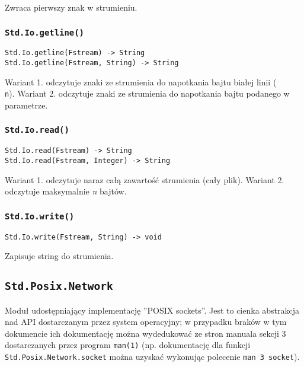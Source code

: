 Zwraca pierwszy znak w strumieniu.

\subsubsection{\texttt{Std.Io.getline()}}

\begin{small}
\begin{lstlisting}
Std.Io.getline(Fstream) -> String
Std.Io.getline(Fstream, String) -> String
\end{lstlisting}
\end{small}

Wariant 1. odczytuje znaki ze strumienia do napotkania bajtu białej linii (\texttt{\\n}).
Wariant 2. odczytuje znaki ze strumienia do napotkania bajtu podanego w parametrze.

\subsubsection{\texttt{Std.Io.read()}}

\begin{small}
\begin{lstlisting}
Std.Io.read(Fstream) -> String
Std.Io.read(Fstream, Integer) -> String
\end{lstlisting}
\end{small}

Wariant 1. odczytuje naraz całą zawartość strumienia (cały plik).
Wariant 2. odczytuje maksymalnie \emph{n} bajtów.

\subsubsection{\texttt{Std.Io.write()}}

\begin{small}
\begin{lstlisting}
Std.Io.write(Fstream, String) -> void
\end{lstlisting}
\end{small}

Zapisuje string do strumienia.

\subsection{\texttt{Std.Posix.Network}}
\label{stdlib_Std_Posix_Network}

Moduł udostępniający implementację ''POSIX sockets''. Jest to cienka abstrakcja nad API dostarczanym przez
system operacyjny; w przypadku braków w tym dokumencie ich dokumentację można wydedukować ze stron manuala
sekcji 3 dostarczanych przez program \texttt{man(1)} (np. dokumentację dla funkcji
\texttt{Std.Posix.Network.socket} można uzyskać wykonując polecenie \texttt{man 3 socket}).

